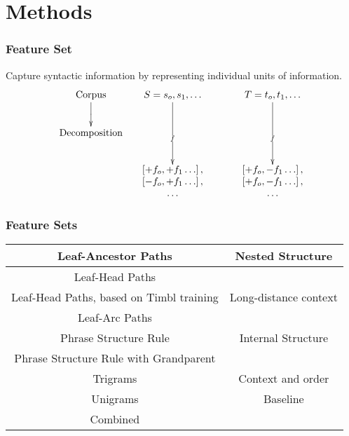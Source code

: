 \documentclass{beamer}
\begin{document}
\section{Methods}
\begin{frame}
  \frametitle{Feature Set}
  Capture syntactic information by representing individual units of
  information.
\[\xymatrix@C=1pc{
 \textrm{Corpus} \ar@{>}[d]|{} &
  S = s_o,s_1,\ldots
  \ar@{>}[dd]|{f}
  &&
  T = t_o,t_1,\ldots
  \ar@{>}[dd]|{f}
  \\
\textrm{Decomposition} &&&\\
 &
 *{\begin{array}{c}
     \left[ + f_o, +f_1 \ldots \right], \\
     \left[ - f_o, +f_1 \ldots \right], \\
     \ldots \\ \end{array}}
 &&
 *{\begin{array}{c}
     \left[ + f_o, -f_1 \ldots \right], \\
     \left[ + f_o, -f_1 \ldots \right], \\
     \ldots \\ \end{array}} \\
} \]

\end{frame}
\begin{frame}
  \frametitle{Feature Sets}
  \begin{tabular}{c|c}
  Leaf-Ancestor Paths & Nested Structure \\ \hline
  Leaf-Head Paths & \\
  Leaf-Head Paths, based on Timbl training &Long-distance context  \\
  Leaf-Arc Paths & \\ \hline
  Phrase Structure Rule & Internal Structure \\
  Phrase Structure Rule with Grandparent & \\ \hline
  Trigrams & Context and order \\ \hline
  Unigrams & Baseline \\ \hline
  Combined & \\
  \end{tabular}
\end{frame}
\end{document}
